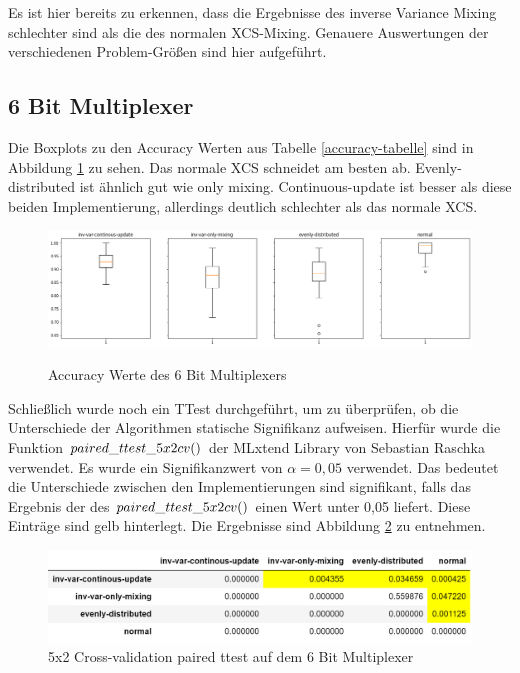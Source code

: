 \documentclass[10pt]{ocsmnar}
\begin{document}
Es ist hier bereits zu erkennen, dass die Ergebnisse des inverse Variance Mixing schlechter sind als die des normalen XCS-Mixing. 
Genauere Auswertungen der verschiedenen Problem-Größen sind hier aufgeführt. 

\subsection{6 Bit Multiplexer}
Die Boxplots zu den Accuracy Werten aus Tabelle \ref{accuracy-tabelle} sind in Abbildung \ref{boxplot-6-bit} zu sehen. Das normale XCS schneidet am besten ab. Evenly-distributed ist ähnlich gut wie only mixing. Continuous-update ist besser als diese beiden Implementierung, allerdings deutlich schlechter als das normale XCS.


\begin{figure}
    \includegraphics[width=\linewidth]{img/boxplot_6Bitpng.png}
    \caption{Accuracy Werte des 6 Bit Multiplexers}
    \label{boxplot-6-bit}
\end{figure}

Schließlich wurde noch ein TTest durchgeführt, um zu überprüfen, ob die Unterschiede der Algorithmen statische Signifikanz aufweisen. Hierfür wurde die Funktion $paired\_\-ttest\-\_5x2cv()$ der MLxtend Library von Sebastian Raschka verwendet. Es wurde ein Signifikanzwert von $\alpha = 0,05$ verwendet. Das bedeutet die Unterschiede zwischen den Implementierungen sind signifikant, falls das Ergebnis der des $paired\_\-ttest\-\_5x2cv()$ einen Wert unter 0,05 liefert. Diese Einträge sind gelb hinterlegt. Die Ergebnisse sind Abbildung \ref{ttest-6-bit} zu entnehmen. 

\begin{figure}
    \includegraphics[width=\linewidth]{img/ttest_6_bit.png}
    \caption{5x2 Cross-validation paired ttest auf dem 6 Bit Multiplexer}\label{ttest-6-bit}
\end{figure}
\end{document}

